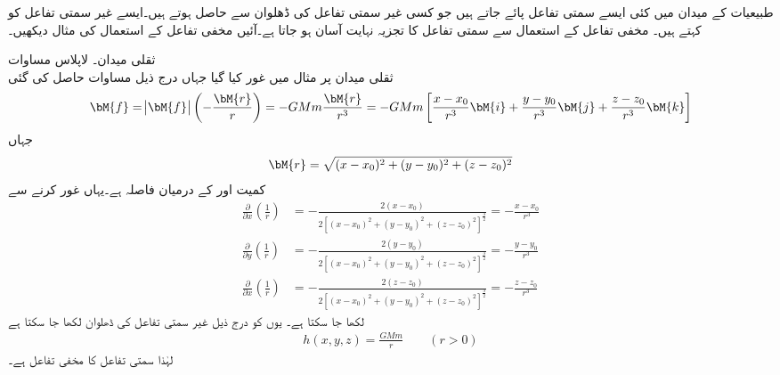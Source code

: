 طبیعیات کے میدان میں کئی ایسے سمتی تفاعل پائے جاتے ہیں جو کسی غیر سمتی تفاعل کی ڈھلوان سے حاصل ہوتے ہیں۔ایسے غیر سمتی تفاعل کو  کہتے ہیں۔ مخفی تفاعل کے استعمال سے سمتی تفاعل کا تجزیہ نہایت آسان ہو جاتا ہے۔آئیں مخفی تفاعل کے استعمال کی مثال دیکھیں۔

\quad ثقلی میدان۔ لاپلاس مساوات\\
ثقلی میدان پر مثال  میں غور کیا گیا جہاں درج ذیل مساوات حاصل کی گئی
\begin{align}
\bM{f}=\abs{\bM{f}}\left(-\frac{\bM{r}}{r}\right)=-GMm\frac{\bM{r}}{r^3}=-GMm\left[\frac{x-x_0}{r^3}\bM{i}+\frac{y-y_0}{r^3}\bM{j}+\frac{z-z_0}{r^3}\bM{k}\right]
\end{align}
جہاں
\begin{align*}
\bM{r}=\sqrt{(x-x_0)^2+(y-y_0)^2+(z-z_0)^2}
\end{align*}
کمیت  اور  کے درمیان فاصلہ ہے۔یہاں غور کرنے سے 
\begin{align}
\frac{\partial }{\partial x}\left(\frac{1}{r}\right)&=-\frac{2(x-x_0)}{2[(x-x_0)^2+(y-y_0)^2+(z-z_0)^2]^{\frac{3}{2}}}=-\frac{x-x_0}{r^3}\\
\frac{\partial }{\partial y}\left(\frac{1}{r}\right)&=-\frac{2(y-y_0)}{2[(x-x_0)^2+(y-y_0)^2+(z-z_0)^2]^{\frac{3}{2}}}=-\frac{y-y_0}{r^3}\\
\frac{\partial }{\partial x}\left(\frac{1}{r}\right)&=-\frac{2(z-z_0)}{2[(x-x_0)^2+(y-y_0)^2+(z-z_0)^2]^{\frac{3}{2}}}=-\frac{z-z_0}{r^3}
\end{align}
لکھا جا سکتا ہے۔ یوں  کو درج ذیل غیر سمتی تفاعل کی ڈھلوان لکھا جا سکتا ہے
\begin{align}
h(x,y,z)=\frac{GMm}{r}\quad \quad (r>0)
\end{align}
لہٰذا سمتی تفاعل  کا مخفی تفاعل  ہے۔

